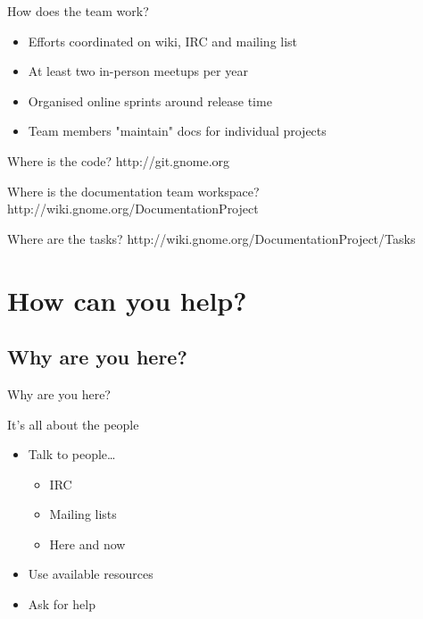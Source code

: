 \documentclass{beamer}
\begin{document}
\begin{frame}{How does the team work?}
  \begin{itemize}
  \item
    Efforts coordinated on wiki, IRC and mailing list
  \item
    At least two in-person meetups per year
  \item
    Organised online sprints around release time
  \item
    Team members "maintain" docs for individual projects
  \end{itemize}
\end{frame}

\begin{frame}{Where is the code?}
  http://git.gnome.org
\end{frame}

\begin{frame}{Where is the documentation team workspace?}
  http://wiki.gnome.org/DocumentationProject
\end{frame}

\begin{frame}{Where are the tasks?}
  http://wiki.gnome.org/DocumentationProject/Tasks
\end{frame}

\section{How can you help?}

\subsection{Why are you here?}

\begin{frame}{Why are you here?}%
\end{frame}

\begin{frame}{It's all about the people}
  \begin{itemize}
  \item
    Talk to people\ldots
    \begin{itemize}
    \item
      IRC
    \item
      Mailing lists
    \item
      Here and now
    \end{itemize}
  \item
    Use available resources
  \item
    Ask for help
  \end{itemize}
\end{frame}
\end{document}
